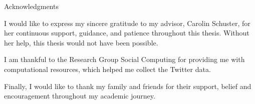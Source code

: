 \thispagestyle{empty}

\vspace*{20mm}

\begin{center}
    { Acknowledgments}
\end{center}

\vspace{10mm}

I would like to express my sincere gratitude to my advisor, Carolin Schuster,
for her continuous support, guidance, and patience throughout this thesis.
Without her help, this thesis would not have been possible.

I am thankful to the Research Group Social Computing for providing me with 
computational resources, which helped me collect the Twitter data. 

Finally, I would like to thank my family and friends for their support,
belief and encouragement throughout my academic journey.

\cleardoublepage{}
